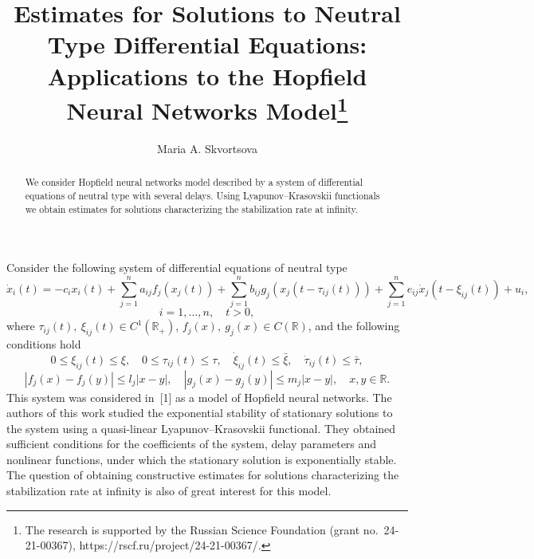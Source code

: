 \documentclass[12pt]{llncs}
\begin{document}
\fi

\title{Estimates for Solutions to Neutral Type Differential Equations: Applications to the Hopfield Neural Networks Model\thanks{The research is supported
by the Russian Science Foundation (grant no.~24-21-00367),
https://rscf.ru/project/24-21-00367/.}}

\author{Maria A. Skvortsova}

\maketitle

\begin{abstract}
We consider Hopfield neural networks model described by a system of differential equations of neutral type with several delays.
Using Lyapunov--Krasovskii functionals we obtain estimates for solutions
characterizing the stabilization rate at infinity.

\end{abstract}

Consider the following system of differential equations of neutral type
$$
\dot{x}_i(t)=-c_i x_i(t)
+\sum\limits_{j=1}^{n} a_{ij} f_j(x_j(t))
+\sum\limits_{j=1}^{n} b_{ij} g_j(x_j(t-\tau_{ij}(t)))
+\sum\limits_{j=1}^{n} e_{ij} \dot{x}_j(t-\xi_{ij}(t))
+u_i,
$$
$$
i=1,\dots,n, \quad t>0,
$$
where
$\tau_{ij}(t), \ \xi_{ij}(t) \in C^1(\mathbb{R}_{+})$,
$f_j(x), \ g_j(x) \in C(\mathbb{R})$,
and the following conditions hold
$$
0 \leq \xi_{ij}(t) \leq \xi,
\quad
0 \leq \tau_{ij}(t) \leq \tau,
\quad
\dot{\xi}_{ij}(t) \leq \bar{\xi},
\quad
\dot{\tau}_{ij}(t) \leq \bar{\tau},
$$
$$
|f_j(x)-f_j(y)| \leq l_j |x-y|,
\quad
|g_j(x)-g_j(y)| \leq m_j |x-y|,
\quad
x,y \in \mathbb{R}.
$$
This system was considered in~[1] as a model of Hopfield neural networks.
The authors of this work studied the exponential stability of stationary solutions to the system using a quasi-linear Lyapunov--Krasovskii functional.
They obtained sufficient conditions for the coefficients of the system, delay parameters and nonlinear functions, under which the stationary solution is exponentially stable.
The question of obtaining constructive estimates for solutions characterizing the stabilization rate at infinity is also of great interest for this model.
\end{document}
